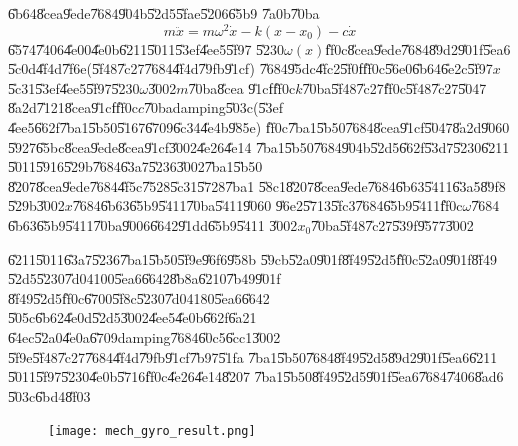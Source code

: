 \U{6b64}\U{8cea}\U{9ede}\U{7684}\U{904b}\U{52d5}\U{5fae}\U{5206}\U{65b9}%
\U{7a0b}\U{70ba}%
\begin{equation*}
m\ddot{x}=m\omega ^{2}\dot{x}-k\left( x-x_{0}\right) -c\dot{x}
\end{equation*}%
\U{6574}\U{7406}\U{4e00}\U{4e0b}\U{6211}\U{5011}\U{53ef}\U{4ee5}\U{5f97}%
\U{5230}$\omega (x)$\U{ff0c}\U{8cea}\U{9ede}\U{7684}\U{89d2}\U{901f}\U{5ea6}%
\U{5c0d}\U{4f4d}\U{7f6e}(\U{5f48}\U{7c27}\U{7684}\U{4f4d}\U{79fb}\U{91cf})%
\U{7684}\U{95dc}\U{4fc2}\U{5f0f}\U{ff0c}\U{56e0}\U{6b64}\U{6e2c}\U{5f97}$x$%
\U{5c31}\U{53ef}\U{4ee5}\U{5f97}\U{5230}$\omega $\U{3002}$m$\U{70ba}\U{8cea}%
\U{91cf}\U{ff0c}$k$\U{70ba}\U{5f48}\U{7c27}\U{ff0c}\U{5f48}\U{7c27}\U{5047}%
\U{8a2d}\U{7121}\U{8cea}\U{91cf}\U{ff0c}$c$\U{70ba}damping\U{503c}(\U{53ef}%
\U{4ee5}\U{662f}\U{7ba1}\U{5b50}\U{5167}\U{6709}\U{6c34}\U{4e4b}\U{985e})%
\U{ff0c}\U{7ba1}\U{5b50}\U{7684}\U{8cea}\U{91cf}\U{5047}\U{8a2d}\U{9060}%
\U{5927}\U{65bc}\U{8cea}\U{9ede}\U{8cea}\U{91cf}\U{3002}\U{4e26}\U{4e14}%
\U{7ba1}\U{5b50}\U{7684}\U{904b}\U{52d5}\U{662f}\U{53d7}\U{5230}\U{6211}%
\U{5011}\U{5916}\U{529b}\U{7684}\U{63a7}\U{5236}\U{3002}\U{7ba1}\U{5b50}%
\U{8207}\U{8cea}\U{9ede}\U{7684}\U{4f5c}\U{7528}\U{5c31}\U{5728}\U{7ba1}%
\U{58c1}\U{8207}\U{8cea}\U{9ede}\U{7684}\U{6b63}\U{5411}\U{63a5}\U{89f8}%
\U{529b}\U{3002}$x$\U{7684}\U{6b63}\U{65b9}\U{5411}\U{70ba}\U{5411}\U{9060}%
\U{96e2}\U{5713}\U{5fc3}\U{7684}\U{65b9}\U{5411}\U{ff0c}$\omega $\U{7684}%
\U{6b63}\U{65b9}\U{5411}\U{70ba}\U{9006}\U{6642}\U{91dd}\U{65b9}\U{5411}%
\U{3002}$x_{0}$\U{70ba}\U{5f48}\U{7c27}\U{539f}\U{9577}\U{3002}

\U{6211}\U{5011}\U{63a7}\U{5236}\U{7ba1}\U{5b50}\U{5f9e}\U{96f6}\U{958b}%
\U{59cb}\U{52a0}\U{901f}\U{8f49}\U{52d5}\U{ff0c}\U{52a0}\U{901f}\U{8f49}%
\U{52d5}\U{5230}\U{7d04}100\U{5ea6}\U{6642}\U{8b8a}\U{6210}\U{7b49}\U{901f}%
\U{8f49}\U{52d5}\U{ff0c}\U{6700}\U{5f8c}\U{5230}\U{7d04}180\U{5ea6}\U{6642}%
\U{505c}\U{6b62}\U{4e0d}\U{52d5}\U{3002}\U{4ee5}\U{4e0b}\U{662f}\U{6a21}%
\U{64ec}\U{52a0}\U{4e0a}\U{6709}damping\U{7684}\U{60c5}\U{6cc1}\U{3002}%
\U{5f9e}\U{5f48}\U{7c27}\U{7684}\U{4f4d}\U{79fb}\U{91cf}\U{7b97}\U{51fa}%
\U{7ba1}\U{5b50}\U{7684}\U{8f49}\U{52d5}\U{89d2}\U{901f}\U{5ea6}\U{6211}%
\U{5011}\U{5f97}\U{5230}\U{4e0b}\U{5716}\U{ff0c}\U{4e26}\U{4e14}\U{8207}%
\U{7ba1}\U{5b50}\U{8f49}\U{52d5}\U{901f}\U{5ea6}\U{7684}\U{7406}\U{8ad6}%
\U{503c}\U{6bd4}\U{8f03}

\begin{center}
\begin{figure}[th]
\caption{{}}
\begin{center}
\texttt{[image: mech\_gyro\_result.png]}
\end{center}
\end{figure}
\end{center}

